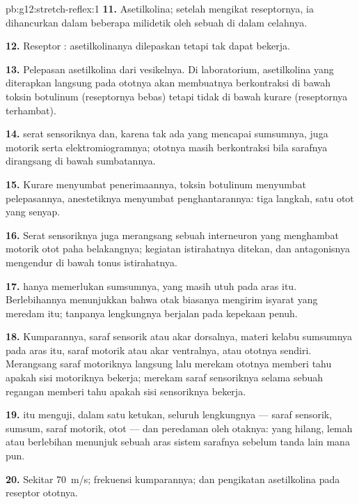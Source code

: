 \begin{solution}{pb:g12:stretch-reflex:1}
\textbf{11.} Asetilkolina; setelah mengikat reseptornya, ia dihancurkan
dalam beberapa milidetik oleh sebuah  di dalam celahnya.

\textbf{12.} Reseptor : asetilkolinanya dilepaskan tetapi
tak dapat bekerja.

\textbf{13.} Pelepasan asetilkolina dari vesikelnya. Di laboratorium,
asetilkolina yang diterapkan langsung pada ototnya akan membuatnya
berkontraksi di bawah toksin botulinum (reseptornya bebas) tetapi tidak
di bawah kurare (reseptornya terhambat).

\textbf{14.}  serat sensoriknya dan, karena tak ada yang
mencapai sumsumnya, juga   motorik serta
elektromiogramnya; ototnya masih berkontraksi bila sarafnya dirangsang
di bawah sumbatannya.

\textbf{15.} Kurare menyumbat penerimaannya, toksin botulinum
menyumbat pelepasannya, anestetiknya menyumbat penghantarannya: tiga
langkah, satu otot yang senyap.

\textbf{16.} Serat sensoriknya juga merangsang sebuah interneuron yang
menghambat  motorik otot paha belakangnya; kegiatan istirahatnya
ditekan, dan antagonisnya mengendur di bawah tonus istirahatnya.

\textbf{17.}  hanya memerlukan sumsumnya, yang masih utuh
pada aras itu. Berlebihannya menunjukkan bahwa otak biasanya mengirim
isyarat yang meredam  itu; tanpanya lengkungnya berjalan pada
kepekaan penuh.

\textbf{18.} Kumparannya, saraf sensorik atau akar dorsalnya, materi
kelabu sumsumnya pada aras itu, saraf motorik atau akar ventralnya,
atau ototnya sendiri. Merangsang saraf motoriknya langsung lalu merekam
ototnya memberi tahu apakah sisi motoriknya bekerja; merekam saraf
sensoriknya selama sebuah regangan memberi tahu apakah sisi sensoriknya
bekerja.

\textbf{19.}  itu menguji, dalam satu ketukan, seluruh
lengkungnya --- saraf sensorik, sumsum, saraf motorik, otot --- dan
peredaman oleh otaknya:  yang hilang, lemah atau berlebihan
menunjuk sebuah aras sistem sarafnya sebelum tanda lain mana pun.

\textbf{20.} Sekitar \qty{70}{m/s}; frekuensi 
kumparannya; dan pengikatan asetilkolina pada reseptor ototnya.
\end{solution}
